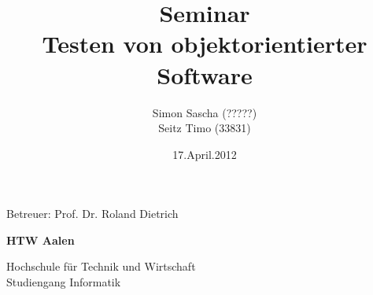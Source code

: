 \documentclass[a4paper,12pt]{article}
\title{
\textbf{Seminar} \\
\vspace{20 mm}
Testen von objektorientierter Software \\
\vspace{20 mm}
}
\author{Simon Sascha (?????) \\
 Seitz Timo (33831)}
\date{17.April.2012}
\begin{document}
\setcounter{page}{0}

\maketitle\thispagestyle{empty}
\vspace{10 mm}
\center Betreuer: Prof. Dr. Roland Dietrich \\
\vspace{50mm}

{\centering\bfseries
HTW Aalen
\par}

{\centering
Hochschule für Technik und Wirtschaft \\
Studiengang Informatik
\par}
\clearpage

\tableofcontents

\section{}
\end{document}
